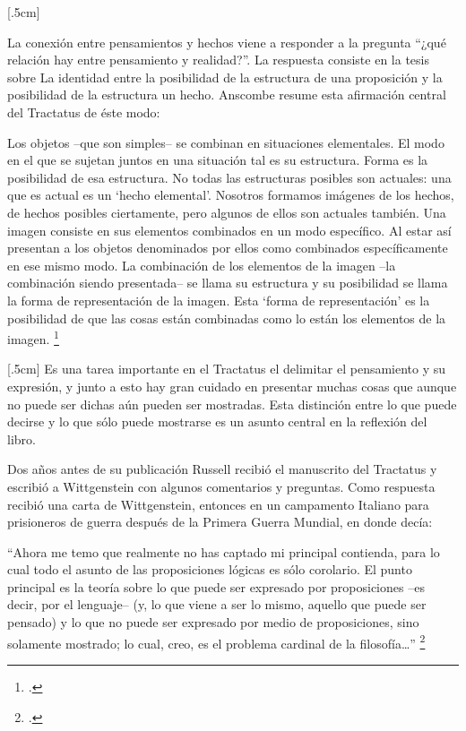 \documentclass[../main.tex]{subfiles}
\begin{document}
[.5cm]

La conexión entre pensamientos y hechos viene a responder a la pregunta ``¿qué relación hay entre pensamiento y realidad?''. La respuesta consiste en la tesis sobre La identidad entre la posibilidad de la estructura de una proposición y la posibilidad de la estructura un hecho. Anscombe resume esta afirmación central del Tractatus de éste modo:

Los objetos --que son simples-- se combinan en situaciones elementales. El modo en el que se sujetan juntos en una situación tal es su estructura. Forma es la posibilidad de esa estructura. No todas las estructuras posibles son actuales: una que es actual es un `hecho elemental'. Nosotros formamos imágenes de los hechos, de hechos posibles ciertamente, pero algunos de ellos son actuales también. Una imagen consiste en sus elementos combinados en un modo específico. Al estar así presentan a los objetos denominados por ellos como combinados específicamente en ese mismo modo. La combinación de los elementos de la imagen --la combinación siendo presentada-- se llama su estructura y su posibilidad se llama la forma de representación de la imagen. 
Esta `forma de representación' es la posibilidad de que las cosas están combinadas como lo están los elementos de la imagen. \footcite[p. 171]{simplicity}

[.5cm]
Es una tarea importante en el Tractatus el delimitar el pensamiento y su expresión, y junto a esto hay gran cuidado en presentar muchas cosas que aunque no puede ser dichas aún pueden ser mostradas. Esta distinción entre lo que puede decirse y lo que sólo puede mostrarse es un asunto central en la reflexión del libro. 

Dos años antes de su publicación Russell recibió el manuscrito del Tractatus y escribió a Wittgenstein con algunos comentarios y preguntas. Como respuesta recibió una carta de Wittgenstein, entonces en un campamento Italiano para prisioneros de guerra después de la Primera Guerra Mundial, en donde decía:

``Ahora me temo que realmente no has captado mi principal contienda, para lo cual todo el asunto de las proposiciones lógicas es sólo corolario. El punto principal es la teoría sobre lo que puede ser expresado por proposiciones --es decir, por el lenguaje-- (y, lo que viene a ser lo mismo, aquello que puede ser pensado) y lo que no puede ser expresado por medio de proposiciones, sino solamente mostrado; lo cual, creo, es el problema cardinal de la filosofía\ldots'' \footcite[p. 161]{IWT}
\end{document}
